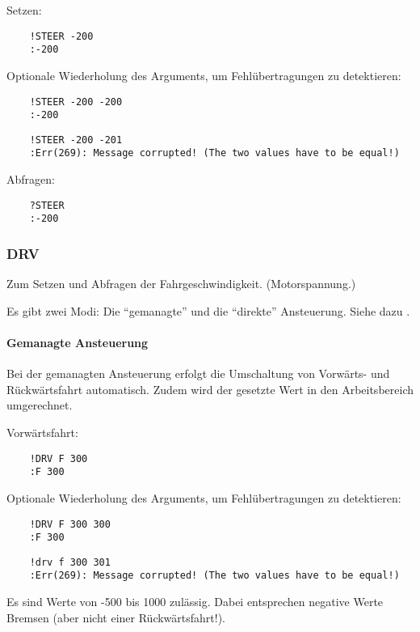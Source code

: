 Setzen:
\begin{verbatim}
	!STEER -200
	:-200
\end{verbatim}

{\color[rgb]{0.75,0.75,0.75} Optionale Wiederholung des Arguments, um Fehlübertragungen zu detektieren:
\begin{verbatim}
	!STEER -200 -200
	:-200
\end{verbatim}

\begin{verbatim}
	!STEER -200 -201
	:Err(269): Message corrupted! (The two values have to be equal!)
\end{verbatim}
}


Abfragen:
\begin{verbatim}
	?STEER
	:-200
\end{verbatim}



\subsubsection{DRV}

Zum Setzen und Abfragen der Fahrgeschwindigkeit. (\Bzw Motorspannung.)

Es gibt zwei Modi: Die "`gemanagte"' und die "`direkte"' Ansteuerung. Siehe dazu .


\paragraph{Gemanagte Ansteuerung}

Bei der gemanagten Ansteuerung erfolgt die Umschaltung von Vorwärts- und Rückwärtsfahrt automatisch. Zudem wird der gesetzte Wert in den Arbeitsbereich umgerechnet.

Vorwärtsfahrt:
\begin{verbatim}
	!DRV F 300
	:F 300
\end{verbatim}
Optionale Wiederholung des Arguments, um Fehlübertragungen zu detektieren:
\begin{verbatim}
	!DRV F 300 300
	:F 300
\end{verbatim}

\begin{verbatim}
	!drv f 300 301
	:Err(269): Message corrupted! (The two values have to be equal!)
\end{verbatim}


Es sind Werte von -500 bis 1000 zulässig. Dabei entsprechen negative Werte Bremsen (aber nicht einer Rückwärtsfahrt!).

